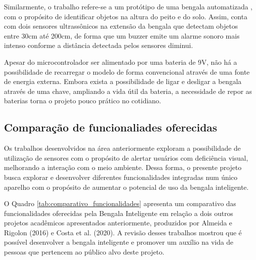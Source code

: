         Similarmente, o trabalho refere-se a um protótipo de uma bengala automatizada \cite{BengalaAutomatizadaArduino}, com o propósito de identificar objetos na altura do peito e do solo. Assim, conta com dois sensores ultrassônicos na extensão da bengala que detectam objetos entre 30cm até 200cm, de forma que um buzzer emite um alarme sonoro mais intenso conforme a distância detectada pelos sensores diminui. 
    
        Apesar do microcontrolador ser alimentado por uma bateria de 9V, não há a possibilidade de recarregar o modelo de forma convencional através de uma fonte de energia externa. Embora exista a possibilidade de ligar e desligar a bengala através de uma chave, ampliando a vida útil da bateria, a necessidade de repor as baterias torna o projeto pouco prático no cotidiano.

    \subsection{Comparação de funcionaliades oferecidas}
    
    Os trabalhos desenvolvidos na área anteriormente exploram a possibilidade de utilização de sensores com o propósito de alertar usuários com deficiência visual, melhorando a interação com o meio ambiente. Dessa forma, o presente projeto busca explorar e desenvolver diferentes funcionalidades integradas num único aparelho com o propósito de aumentar o potencial de uso da bengala inteligente. 

    
    O Quadro \ref{tab:comparativo_funcionalidades} apresenta um comparativo das funcionalidades oferecidas pela Bengala Inteligente em relação a dois outros projetos acadêmicos apresentados anteriormente, produzidos por Almeida e Rigolon (2016) e Costa et al. (2020). A revisão desses trabalhos mostrou que é possível desenvolver a bengala inteligente e promover um auxílio na vida de pessoas que pertencem ao público alvo deste projeto.

